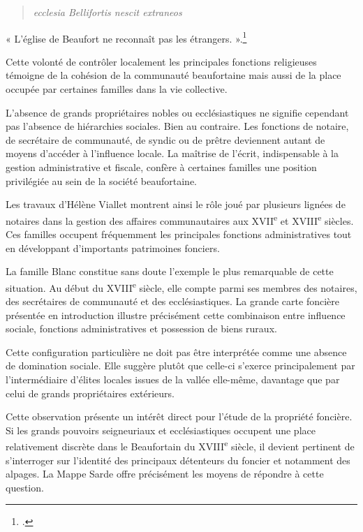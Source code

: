 \documentclass[12pt,a4paper]{report}
\begin{document}
\begin{quote}
	\textit{ecclesia Bellifortis nescit extraneos}
\end{quote}

« L'église de Beaufort ne reconnaît pas les étrangers. ».\footcite[148--149]{CarrierMouthon2010PaysansAlpes}

Cette volonté de contrôler localement les principales fonctions religieuses témoigne de la cohésion de la communauté beaufortaine mais aussi de la place occupée par certaines familles dans la vie collective.

L'absence de grands propriétaires nobles ou ecclésiastiques ne signifie cependant pas l'absence de hiérarchies sociales. Bien au contraire. Les fonctions de notaire, de secrétaire de communauté, de syndic ou de prêtre deviennent autant de moyens d'accéder à l'influence locale. La maîtrise de l'écrit, indispensable à la gestion administrative et fiscale, confère à certaines familles une position privilégiée au sein de la société beaufortaine.

Les travaux d'Hélène Viallet montrent ainsi le rôle joué par plusieurs lignées de notaires dans la gestion des affaires communautaires aux XVII\textsuperscript{e} et XVIII\textsuperscript{e} siècles. Ces familles occupent fréquemment les principales fonctions administratives tout en développant d'importants patrimoines fonciers.

La famille Blanc constitue sans doute l'exemple le plus remarquable de cette situation. Au début du XVIII\textsuperscript{e} siècle, elle compte parmi ses membres des notaires, des secrétaires de communauté et des ecclésiastiques. La grande carte foncière présentée en introduction illustre précisément cette combinaison entre influence sociale, fonctions administratives et possession de biens ruraux.

Cette configuration particulière ne doit pas être interprétée comme une absence de domination sociale. Elle suggère plutôt que celle-ci s'exerce principalement par l'intermédiaire d'élites locales issues de la vallée elle-même, davantage que par celui de grands propriétaires extérieurs.

Cette observation présente un intérêt direct pour l'étude de la propriété foncière. Si les grands pouvoirs seigneuriaux et ecclésiastiques occupent une place relativement discrète dans le Beaufortain du XVIII\textsuperscript{e} siècle, il devient pertinent de s'interroger sur l'identité des principaux détenteurs du foncier et notamment des alpages. La Mappe Sarde offre précisément les moyens de répondre à cette question.
\end{document}
